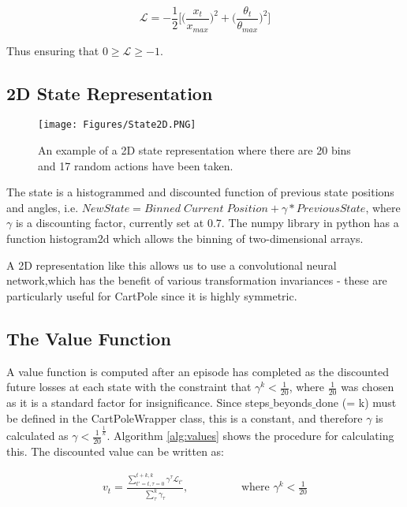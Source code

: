 \documentclass[12pt]{article}
\newcommand{\loss}{\mathcal{L}}
\begin{document}
\begin{equation}
   \loss = - \frac{1}{2} \bigg[ \Big(\frac{x_t}{x_{max}}\Big)^2 + \Big(\frac{\theta_t}{\theta_{max}}\Big)^2 \bigg]
\end{equation}

Thus ensuring that $0 \geq \loss \geq -1$.

\subsection{2D State Representation}

\begin{wrapfigure}{r}{0.35\textwidth}
   \vspace{-1cm}
   \centering
   \texttt{[image: Figures/State2D.PNG]}
   \caption{An example of a 2D state representation where there are 20 bins and 17 random actions have been taken.}
   \label{fig:state2D}
\end{wrapfigure}

The state is a histogrammed and discounted function of previous state positions and angles, i.e. $New State = Binned \; Current \; Position + \gamma * Previous State$, where $\gamma$ is a discounting factor, currently set at 0.7. The numpy library in python has a function histogram2d which allows the binning of two-dimensional arrays.

A 2D representation like this allows us to use a convolutional neural network,which has the benefit of various transformation invariances - these are particularly useful for CartPole since it is highly symmetric.

\subsection{The Value Function}

A value function is computed after an episode has completed as the discounted future losses at each state with the constraint that $\gamma^{k} < \frac{1}{20}$, where $\frac{1}{20}$ was chosen as it is a standard factor for insignificance. Since steps$\_$beyonds$\_$done (= k) must be defined in the CartPoleWrapper class, this is a constant, and therefore $\gamma$ is calculated as $\gamma < \frac{1}{20}^{\frac{1}{k}}$. Algorithm \ref{alg:values} shows the procedure for calculating this. The discounted value can be written as:

\begin{align}
   v_t = \frac{\sum_{t'=t, \tau=0}^{t+k, k} \gamma^\tau \loss_{t'} }{\sum_{\tau}^k \gamma_\tau}, \hspace{2cm} \text{where } \gamma^k < \frac{1}{20}
\end{align}
\end{document}
